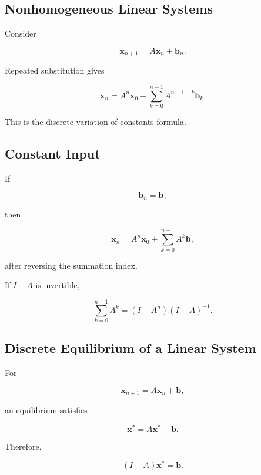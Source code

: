 \subsection{Nonhomogeneous Linear Systems}
\label{subsec:nonhomogeneous-discrete-linear-systems}

Consider

\[
\boxed{
\mathbf{x}_{n+1}
=
A\mathbf{x}_n
+
\mathbf{b}_n.
}
\]

Repeated substitution gives

\[
\boxed{
\mathbf{x}_n
=
A^n\mathbf{x}_0
+
\sum_{k=0}^{n-1}
A^{n-1-k}
\mathbf{b}_k.
}
\]

This is the discrete variation-of-constants formula.

\subsection{Constant Input}
\label{subsec:discrete-system-constant-input}

If

\[
\mathbf{b}_n=\mathbf{b},
\]

then

\[
\boxed{
\mathbf{x}_n
=
A^n\mathbf{x}_0
+
\sum_{k=0}^{n-1}
A^k\mathbf{b},
}
\]

after reversing the summation index.

If \(I-A\) is invertible,

\[
\boxed{
\sum_{k=0}^{n-1}
A^k
=
(I-A^n)(I-A)^{-1}.
}
\]

\subsection{Discrete Equilibrium of a Linear System}
\label{subsec:discrete-linear-system-equilibrium}

For

\[
\mathbf{x}_{n+1}
=
A\mathbf{x}_n+\mathbf{b},
\]

an equilibrium satisfies

\[
\mathbf{x}^*
=
A\mathbf{x}^*
+
\mathbf{b}.
\]

Therefore,

\[
\boxed{
(I-A)\mathbf{x}^*
=
\mathbf{b}.
}
\]

